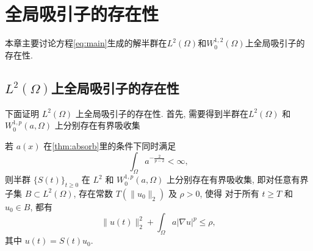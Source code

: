 \documentclass[oneside,longtitle]{LZUthesis}
\numberwithin{equation}{chapter}
\newcommand*\abs[1]{\lvert#1\rvert}
\newcommand*\norm[1]{\lVert#1\rVert}
\newcommand*\Brace[1]{\lbrace#1\rbrace}
\begin{document}
\chapter{全局吸引子的存在性}\label{ch:existence_of_the_global_attractors}
本章主要讨论方程\cref{eq:main}生成的解半群在$L^2(\Omega)$和$W_0^{1,2}(\Omega)$上全局吸引子的存在性.
\section{$L^2(\Omega)$上全局吸引子的存在性}
下面证明 $L^2(\Omega)$ 上全局吸引子的存在性.
首先, 需要得到半群在$L^2(\Omega)$ 和 $W_0^{1,p}(a,\Omega)$ 上分别存在有界吸收集

\begin{theorem}\label{thm:real_absorb}
	若 $a(x)$ 在\cref{thm:absorb}里的条件下同时满足
	\begin{equation}\label{eq:a_condition}
		\int_{\Omega}a^{-\frac{2}{p-2}} < \infty,
	\end{equation}
	则半群 $\Brace{S(t)}_{t \geq 0} $ 在
	$L^2$ 和 $W_0^{1,p}(a,\Omega)$ 上分别存在有界吸收集, 即对任意有界子集
	$B \subset L^2(\Omega)$, 存在常数 $T(\norm{u_0}_2)$ 及 $\rho > 0$, 使得
	对于所有 $t \geq T$ 和 $u_0 \in B$, 都有
	\begin{equation*}
		\norm{u(t)}_2^2 + \int_{\Omega}a\abs{\nabla u}^p \leq \rho,
	\end{equation*}
	其中 $u(t) = S(t)u_0$.
\end{theorem}
\end{document}
